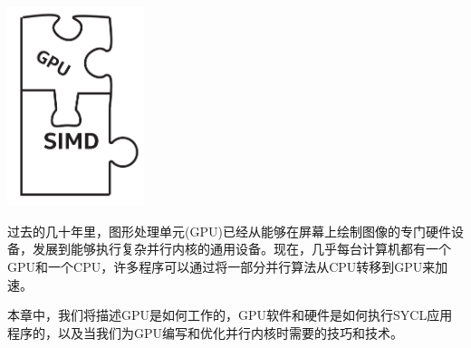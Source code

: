 \begin{center}
	\includegraphics[width=0.3\textwidth]{content/chapter-15/images/1}
\end{center}

过去的几十年里，图形处理单元(GPU)已经从能够在屏幕上绘制图像的专门硬件设备，发展到能够执行复杂并行内核的通用设备。现在，几乎每台计算机都有一个GPU和一个CPU，许多程序可以通过将一部分并行算法从CPU转移到GPU来加速。\par

本章中，我们将描述GPU是如何工作的，GPU软件和硬件是如何执行SYCL应用程序的，以及当我们为GPU编写和优化并行内核时需要的技巧和技术。\par























































